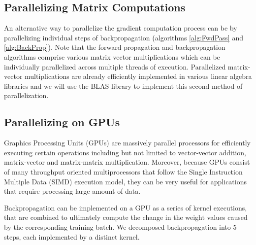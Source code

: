 \subsection{Parallelizing Matrix Computations}
\label{sub:ParMatComp}

An alternative way to parallelize the gradient computation process can be by parallelizing individual steps of backpropagation (algorithms \ref{alg:FwdPass} and \ref{alg:BackProp}).
Note that the forward propagation and backpropagation algorithms comprise various matrix vector multiplications which can be individually parallelized across multiple threads of execution.
Parallelized matrix-vector multiplications are already efficiently implemented in various linear algebra libraries and we will use the BLAS library to implement this second method of parallelization.

\subsection{Parallelizing on GPUs}
\label{sub:GPU}

Graphics Processing Units (GPUs) are massively parallel processors for efficiently executing certain operations including but not limited to vector-vector addition, matrix-vector and matrix-matrix multiplication. Moreover, because GPUs consist of many throughput oriented multiprocessors that follow the Single Instruction Multiple Data (SIMD) execution model, they can be very useful for applications that require processing large amount of data.

Backpropagation can be implemented on a GPU as a series of kernel executions, that are combined to ultimately compute the change in the weight values caused by the corresponding training batch.
We decomposed backpropagation into 5 steps, each implemented by a distinct kernel.